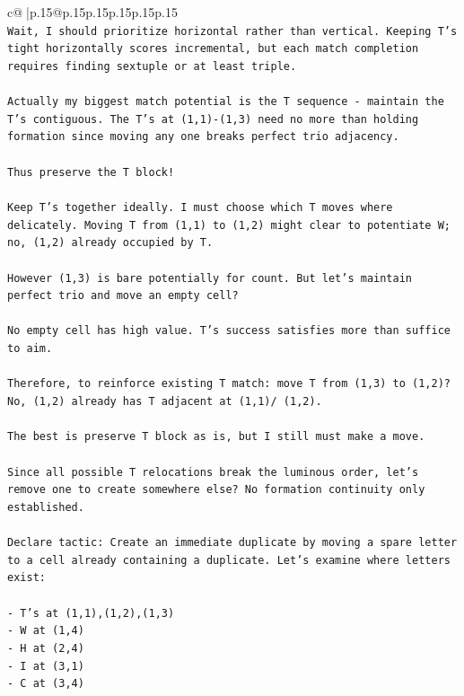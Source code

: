 \documentclass{article}
\begin{document}
{\begin{supertabular}{c@{$\;$}|p{.15\linewidth}@{}p{.15\linewidth}p{.15\linewidth}p{.15\linewidth}p{.15\linewidth}p{.15\linewidth}}
{{{\\ 
\texttt{Wait, I should prioritize horizontal rather than vertical. Keeping T's tight horizontally scores incremental, but each match completion requires finding sextuple or at least triple.} \\
\\ 
\texttt{Actually my biggest match potential is the T sequence {-} maintain the T's contiguous. The T's at (1,1){-}(1,3) need no more than holding formation since moving any one breaks perfect trio adjacency.} \\
\\ 
\texttt{Thus preserve the T block!} \\
\\ 
\texttt{Keep T's together ideally. I must choose which T moves where delicately. Moving T from (1,1) to (1,2) might clear to potentiate W; no, (1,2) already occupied by T.} \\
\\ 
\texttt{However (1,3) is bare potentially for count. But let's maintain perfect trio and move an empty cell?} \\
\\ 
\texttt{No empty cell has high value. T's success satisfies more than suffice to aim.} \\
\\ 
\texttt{Therefore, to reinforce existing T match: move T from (1,3) to (1,2)? No, (1,2) already has T adjacent at (1,1)/ (1,2).} \\
\\ 
\texttt{The best is preserve T block as is, but I still must make a move.} \\
\\ 
\texttt{Since all possible T relocations break the luminous order, let's remove one to create somewhere else? No formation continuity only established.} \\
\\ 
\texttt{Declare tactic: Create an immediate duplicate by moving a spare letter to a cell already containing a duplicate. Let's examine where letters exist:} \\
\\ 
\texttt{{-} T's at (1,1),(1,2),(1,3)} \\
\texttt{{-} W at (1,4)} \\
\texttt{{-} H at (2,4)} \\
\texttt{{-} I at (3,1)} \\
\texttt{{-} C at (3,4)} \\
\\ 
}}}
\end{supertabular}}
\end{document}
